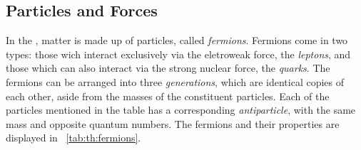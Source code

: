 \subsection{Particles and Forces}
\label{sec:th:particlesandforces}
 In the \SM, matter is made up of \SpinHalf particles, called \emph{fermions}. Fermions come in two types: those wich interact exclusively via the eletroweak force, the \emph{leptons}, and those which can also interact via the strong nuclear force, the \emph{quarks}. The fermions can be arranged into three \emph{generations}, which are identical copies of each other, aside from the masses of the constituent particles. 
Each of the particles mentioned in the table has a corresponding \emph{antiparticle}, with the same mass and opposite quantum numbers.
The \SM fermions and their properties are displayed in \Tab~\ref{tab:th:fermions}.

